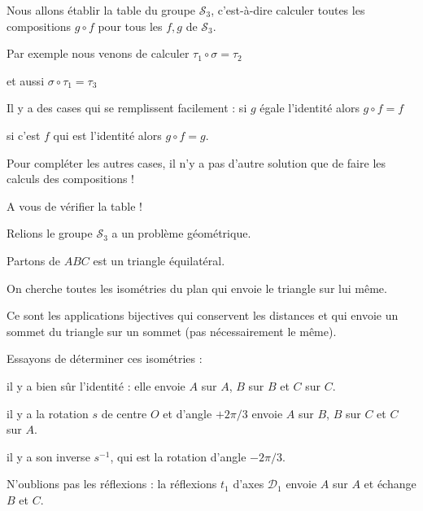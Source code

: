 \diapo

Nous allons établir la table du groupe $\mathcal{S}_3$, c'est-à-dire
calculer toutes les compositions $g \circ f$ pour tous les $f,g$ de 
$\mathcal{S}_3$.

\change

Par exemple nous venons de calculer $\tau_1 \circ \sigma = \tau_2$

\change
 
et aussi  $\sigma \circ \tau_1=\tau_3$

\change

Il y a des cases qui se remplissent facilement : si $g$ égale l'identité
 alors $g \circ f = f$

\change

si c'est $f$ qui est l'identité alors $g\circ f = g$.

\change

Pour compléter les autres cases, il n'y a pas d'autre solution que de faire
les calculs des compositions !

A vous de vérifier la table !

\diapo

Relions le groupe $\mathcal{S}_3$ a un problème géométrique.

Partons de $ABC$ est un triangle équilatéral.

\change

\change

On cherche toutes les isométries du plan qui envoie le triangle sur lui même.

Ce sont les applications bijectives qui conservent les distances et qui envoie
un sommet du triangle sur un sommet (pas nécessairement le même).

\change

Essayons de déterminer ces isométries :

il y a bien sûr l'identité : elle envoie $A$ sur $A$, 
$B$ sur $B$ et $C$ sur $C$.

\change

il y a la rotation $s$ de centre $O$ et d'angle $+2\pi/3$ envoie
$A$ sur $B$, $B$ sur $C$ et $C$ sur $A$.


il y a son inverse $s^{-1}$, qui est la rotation d'angle $-2\pi/3$.

\change


N'oublions pas les réflexions : la réflexions $t_1$ d'axes $\mathcal{D}_1$
envoie $A$ sur $A$ et échange $B$ et $C$.

